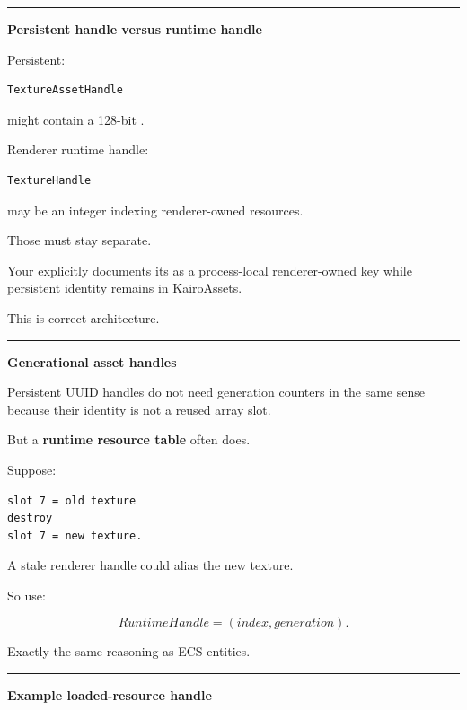 \begin{center}\rule{0.5\linewidth}{0.5pt}\end{center}

\textbf{Persistent handle versus runtime handle}

Persistent:

\begin{verbatim}
TextureAssetHandle
\end{verbatim}

might contain a 128-bit .

Renderer runtime handle:

\begin{verbatim}
TextureHandle
\end{verbatim}

may be an integer indexing renderer-owned resources.

Those must stay separate.

Your  explicitly documents its  as a process-local renderer-owned key while persistent identity remains in KairoAssets.

This is correct architecture.

\begin{center}\rule{0.5\linewidth}{0.5pt}\end{center}

\textbf{Generational asset handles}

Persistent UUID handles do not need generation counters in the same sense because their identity is not a reused array slot.

But a \textbf{runtime resource table} often does.

Suppose:

\begin{verbatim}
slot 7 = old texture
destroy
slot 7 = new texture.
\end{verbatim}

A stale renderer handle  could alias the new texture.

So use:

\[
RuntimeHandle=(index,generation).
\]

Exactly the same reasoning as ECS entities.

\begin{center}\rule{0.5\linewidth}{0.5pt}\end{center}

\textbf{Example loaded-resource handle}

